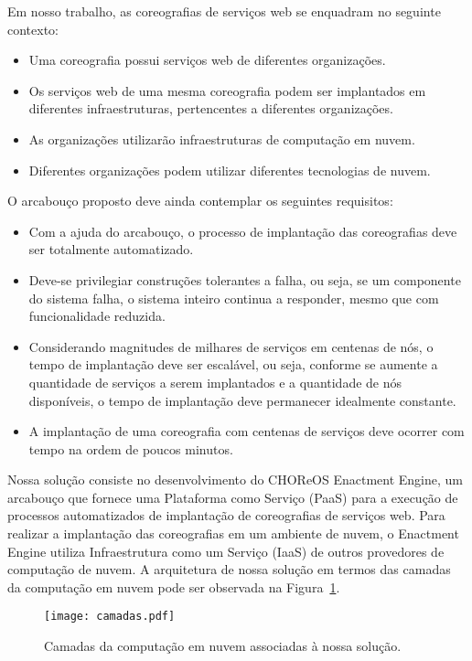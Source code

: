 Em nosso trabalho, as coreografias de serviços web se enquadram no seguinte contexto:

\begin{itemize}
\item Uma coreografia possui serviços web de diferentes organizações.
\item Os serviços web de uma mesma coreografia podem ser implantados em diferentes infraestruturas, pertencentes a diferentes organizações.
\item As organizações utilizarão infraestruturas de computação em nuvem.
\item Diferentes organizações podem utilizar diferentes tecnologias de nuvem.
\end{itemize}

O arcabouço proposto deve ainda contemplar os seguintes requisitos:

\begin{itemize}
\item Com a ajuda do arcabouço, o processo de implantação das coreografias deve ser totalmente automatizado.
\item Deve-se privilegiar construções tolerantes a falha, ou seja, se um componente do sistema falha, o sistema inteiro continua a responder, mesmo que com funcionalidade reduzida.
\item Considerando magnitudes de milhares de serviços em centenas de nós, o tempo de implantação deve ser escalável, ou seja, conforme se aumente a quantidade de serviços a serem implantados e a quantidade de nós disponíveis, o tempo de implantação deve permanecer idealmente constante. 
\item A implantação de uma coreografia com centenas de serviços deve ocorrer com tempo na ordem de poucos minutos.
\end{itemize}

Nossa solução consiste no desenvolvimento do CHOReOS Enactment Engine, um arcabouço que fornece uma Plataforma como Serviço (PaaS) para a execução de processos automatizados de implantação de coreografias de serviços web. Para realizar a implantação das coreografias em um ambiente de nuvem, o Enactment Engine utiliza Infraestrutura como um Serviço (IaaS) de outros provedores de computação de nuvem. A arquitetura de nossa solução em termos das camadas da computação em nuvem pode ser observada na Figura~\ref{fig:camadas_nuvem}.

\begin{figure}[!h]
  \centering
  \texttt{[image: camadas.pdf]} 
  \caption{Camadas da computação em nuvem associadas à nossa solução.}
  \label{fig:camadas_nuvem} 
\end{figure}

